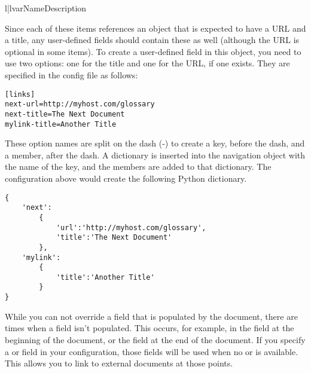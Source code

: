 \begin{tableii}{l|l}{var}{Name}{Description}
\end{tableii}

Since each of these items references an object that is expected to have
a URL and a title, any user-defined fields should contain these as well
(although the URL is optional in some items).  To create a user-defined
field in this object, you need to use two options: one for the title
and one for the URL, if one exists.  They are specified in the config
file as follows:
\begin{verbatim}
[links]
next-url=http://myhost.com/glossary
next-title=The Next Document
mylink-title=Another Title
\end{verbatim}

These option names are split on the dash (-) to create a key, before the dash,
and a member, after the dash.  A dictionary is inserted into the navigation
object with the name of the key, and the members are added to that dictionary.
The configuration above would create the following Python dictionary.
\begin{verbatim}
{
    'next':
        {
            'url':'http://myhost.com/glossary',
            'title':'The Next Document'
        },
    'mylink':
        {
            'title':'Another Title'
        }
}
\end{verbatim}

While you can not override a field that is populated by the document,
there are times when a field isn't populated.  This occurs, for example,
in the  field at the beginning of the document, or the
 field at the end of the document.  If you specify a 
or  field in your configuration, those fields will be used
when no  or  is available.  This allows you to link
to external documents at those points.


